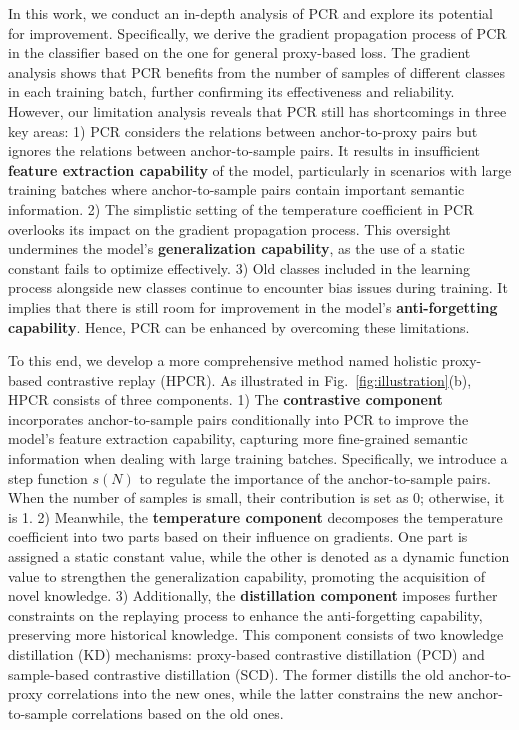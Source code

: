In this work, we conduct an in-depth analysis of PCR and explore its potential for improvement. Specifically, we derive the gradient propagation process of PCR in the classifier based on the one for general proxy-based loss. The gradient analysis shows that PCR benefits from the number of samples of different classes in each training batch, further confirming its effectiveness and reliability. However, our limitation analysis reveals that PCR still has shortcomings in three key areas: 1) PCR considers the relations between anchor-to-proxy pairs but ignores the relations between anchor-to-sample pairs. It results in insufficient \textbf{feature extraction capability} of the model, particularly in scenarios with large training batches where anchor-to-sample pairs contain important semantic information. 2) The simplistic setting of the temperature coefficient in PCR overlooks its impact on the gradient propagation process. This oversight undermines the model's \textbf{generalization capability}, as the use of a static constant fails to optimize effectively. 3) Old classes included in the learning process alongside new classes continue to encounter bias issues during training. It implies that there is still room for improvement in the model's \textbf{anti-forgetting capability}. Hence, PCR can be enhanced by overcoming these limitations.


To this end, we develop a more comprehensive method named holistic proxy-based contrastive replay (HPCR). As illustrated in Fig.~\ref{fig:illustration}(b), HPCR consists of three components. 1) The \textbf{contrastive component} incorporates anchor-to-sample pairs conditionally into PCR to improve the model's feature extraction capability, capturing more fine-grained semantic information when dealing with large training batches. Specifically, we introduce a step function $s(N)$ to regulate the importance of the anchor-to-sample pairs. When the number of samples is small, their contribution is set as 0; otherwise, it is 1. 2) Meanwhile, the \textbf{temperature component} decomposes the temperature coefficient into two parts based on their influence on gradients. One part is assigned a static constant value, while the other is denoted as a dynamic function value to strengthen the generalization capability, promoting the acquisition of novel knowledge. 3) Additionally, the \textbf{distillation component} imposes further constraints on the replaying process to enhance the anti-forgetting capability, preserving more historical knowledge. This component consists of two knowledge distillation (KD) mechanisms: proxy-based contrastive distillation (PCD) and sample-based contrastive distillation (SCD). The former distills the old anchor-to-proxy correlations into the new ones, while the latter constrains the new anchor-to-sample correlations based on the old ones. 

